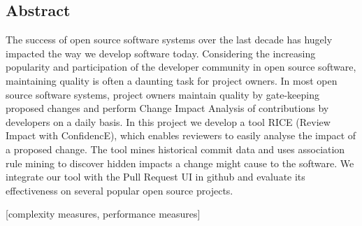 
\subsection*{Abstract}
The success of open source software systems over the last decade has hugely impacted the way we develop software today. Considering the increasing popularity and participation of the developer community in open source software, maintaining quality is often a daunting task for project owners. In most open source software systems, project owners maintain quality by gate-keeping proposed changes and perform Change Impact Analysis of contributions by developers on a daily basis. In this project we develop a tool RICE (Review Impact with ConfidencE), which enables reviewers to easily analyse the impact of a proposed change. The tool mines historical commit data and uses association rule mining to discover hidden impacts a change might cause to the software. We integrate our tool with the Pull Request UI in github and evaluate its effectiveness on several popular open source projects.



[complexity measures, performance measures]


